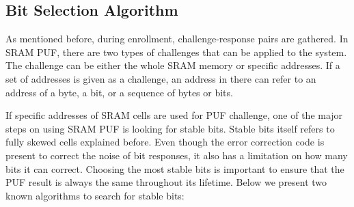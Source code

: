 \subsection{Bit Selection Algorithm} \label{lbl:bit-selection}
As mentioned before, during enrollment, challenge-response pairs are gathered. In SRAM PUF, there are two types of challenges that can be applied to the system. The challenge can be either the whole SRAM memory or specific addresses. If a set of addresses is given as a challenge, an address in there can refer to an address of a byte, a bit, or a sequence of bytes or bits.

If specific addresses of SRAM cells are used for PUF challenge, one of the major steps on using SRAM PUF is looking for stable bits. Stable bits itself refers to fully skewed cells explained before.
Even though the error correction code is present to correct the noise of bit responses, it also has a limitation on how many bits it can correct.
Choosing the most stable bits is important to ensure that the PUF result is always the same throughout its lifetime.
Below we present two known algorithms to search for stable bits:
